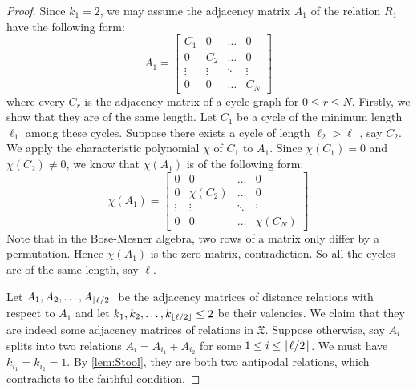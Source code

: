 \documentclass[12pt]{amsart}
\DeclarePairedDelimiter{\floor}{\lfloor}{\rfloor}
\begin{document}
	\begin{proof}
		Since $k_1 = 2$, we may assume the adjacency matrix $A_1$ of the relation $R_1$ have the following form:
		\[
			A_1 = 
				\begin{bmatrix}
					C_1 	& 0		& \dots 	& 0 	\\
					0		& C_2 	& \dots 	& 0 	\\
					\vdots	& \vdots& \ddots 	& \vdots 	\\
					0		& 0		& \ldots			& C_N 	
				\end{bmatrix}
		\]
		where every $C_r$ is the adjacency matrix of a cycle graph for $0 \leq r \leq N$. Firstly, we show that they are of the same length. Let $C_1$ be a cycle of the minimum length $\ell_1$ among these cycles. Suppose there exists a cycle of length $\ell_2 > \ell_1$, say $C_2$. We apply  the characteristic polynomial $\chi$ of $C_1$ to $A_1$. Since $\chi(C_1) = 0$ and $\chi(C_2) \neq 0$, we know that $\chi(A_1)$ is of the following form:
		\[
			\chi(A_1) = 
				\begin{bmatrix}
					0 		& 0		& \dots 	& 0 	\\
					0		& \chi(C_2) 	& \dots 	& 0 	\\
					\vdots	& \vdots& \ddots 	& \vdots 	\\
					0		& 0		& \dots			& \chi(C_N) 	
				\end{bmatrix}
		\]
		Note that in the Bose-Mesner algebra, two rows of a matrix only differ by a permutation. Hence $\chi(A_1)$ is the zero matrix, contradiction. So all the cycles are of the same length, say $\ell$. 

		Let $A_1, A_2, \dots, A_{\floor{\ell/2}}$ be the adjacency matrices of distance relations with respect to $A_1$ and let $k_1, k_2, \dots, k_{\floor{\ell/2}} \leq 2$ be their valencies. We claim that they are indeed some adjacency matrices of relations in $\mathfrak{X}$. 
		Suppose otherwise, say $A_i$ splits into two relations $A_i = A_{i_1} + A_{i_2}$ for some $1 \leq i \leq \floor{\ell/2}$. 
		We must have $k_{i_1} = k_{i_2} =1$.
		By \cref{lem:Stool}, they are both two antipodal relations, which contradicts to the faithful condition.
		

\end{proof}
\end{document}
